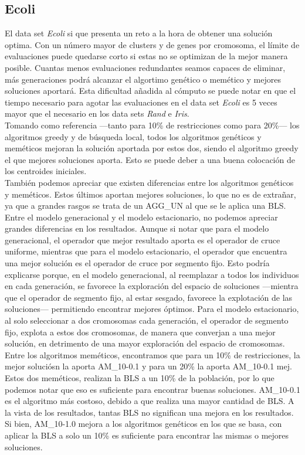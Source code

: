 \subsection{Ecoli}
El data set \emph{Ecoli} si que presenta un reto a la hora de obtener una solución optima. Con un número mayor de clusters y de genes por cromosoma, el límite de evaluaciones puede quedarse corto si estas no se optimizan de la mejor manera posible. Cuantas menos evaluaciones redundantes seamos capaces de eliminar, más generaciones podrá alcanzar el algortimo genético o memético y mejores soluciones aportará. Esta dificultad añadida al cómputo se puede notar en que el tiempo necesario para agotar las evaluaciones en el data set \emph{Ecoli} es 5 veces mayor que el necesario en los data sets \emph{Rand} e \emph{Iris}.
\\
Tomando como referencia ---tanto para 10\% de restricciones como para 20\%--- los algoritmos greedy y de búsqueda local, todos los algoritmos genéticos y meméticos mejoran la solución aportada por estos dos, siendo el algoritmo greedy el que mejores soluciones aporta. Esto se puede deber a una buena colocación de los centroides iniciales.
\\
También podemos apreciar que existen diferencias entre los algoritmos genéticos y meméticos. Estos últimos aportan mejores soluciones, lo que no es de extrañar, ya que a grandes rasgos se trata de un AGG\_UN al que se le aplica una BLS.
Entre el modelo generacional y el modelo estacionario, no podemos apreciar grandes diferencias en los resultados. Aunque si notar que para el modelo generacional, el operador que mejor resultado aporta es el operador de cruce uniforme, mientras que para el modelo estacionario, el operador que encuentra una mejor solución es el operador de cruce por segmento fijo.
Esto podría explicarse porque, en el modelo generacional, al reemplazar a todos los individuos en cada generación, se favorece la exploración del espacio de soluciones ---mientra que el operador de segmento fijo, al estar sesgado, favorece la explotación de las soluciones--- permitiendo encontrar mejores óptimos. Para el modelo estacionario, al solo seleccionar a dos cromosomas cada generación, el operador de segmento fijo, explota a estos dos cromosomas, de manera que converjan a una mejor solución, en detrimento de una mayor exploración del espacio de cromosomas.
\\
Entre los algoritmos meméticos, encontramos que para un 10\% de restricciones, la mejor soluciósn la aporta AM\_10-0.1 y para un 20\% la aporta AM\_10-0.1 mej.
Estos dos meméticos, realizan la BLS a un 10\% de la población, por lo que podemos notar que eso es suficiente para encontrar buenas soluciones. AM\_10-0.1 es el algoritmo más costoso, debido a que realiza una mayor cantidad de BLS. A la vista de los resultados, tantas BLS no significan una mejora en los resultados. Si bien, AM\_10-1.0 mejora a los algoritmos genéticos en los que se basa, con aplicar la BLS a solo un 10\% es suficiente para encontrar las mismas o mejores soluciones.


